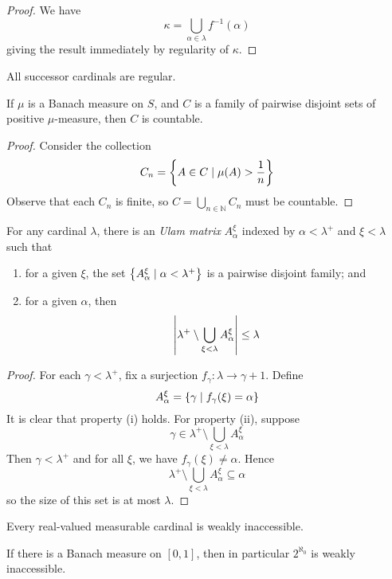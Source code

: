 \begin{proof}
    We have
    \[ \kappa = \bigcup_{\alpha \in \lambda} f^{-1}(\alpha) \]
    giving the result immediately by regularity of \( \kappa \).
\end{proof}
\begin{proposition}
    All successor cardinals are regular.
\end{proposition}
\begin{proposition}
    If \( \mu \) is a Banach measure on \( S \), and \( C \) is a family of pairwise disjoint sets of positive \( \mu \)-measure, then \( C \) is countable.
\end{proposition}
\begin{proof}
    Consider the collection
    \[ C_n = \qty{A \in C \mid \mu(A) > \frac{1}{n}} \]
    Observe that each \( C_n \) is finite, so \( C = \bigcup_{n \in \mathbb N} C_n \) must be countable.
\end{proof}
\begin{lemma}[Ulam]
    For any cardinal \( \lambda \), there is an \emph{Ulam matrix} \( A_\alpha^\xi \) indexed by \( \alpha < \lambda^+ \) and \( \xi < \lambda \) such that
    \begin{enumerate}
        \item for a given \( \xi \), the set \( \qty{A_\alpha^\xi \mid \alpha < \lambda^+} \) is a pairwise disjoint family; and
        \item for a given \( \alpha \), then
        \[ \abs{\lambda^+ \setminus \bigcup_{\xi < \lambda} A_\alpha^\xi} \leq \lambda \]
    \end{enumerate}
\end{lemma}
\begin{proof}
    For each \( \gamma < \lambda^+ \), fix a surjection \( f_\gamma : \lambda \to \gamma + 1 \).
    Define
    \[ A_\alpha^\xi = \qty{\gamma \mid f_\gamma(\xi) = \alpha} \]
    It is clear that property (i) holds.
    For property (ii), suppose
    \[ \gamma \in \lambda^+ \setminus \bigcup_{\xi < \lambda} A_\alpha^\xi \]
    Then \( \gamma < \lambda^+ \) and for all \( \xi \), we have \( f_\gamma(\xi) \neq \alpha \).
    Hence
    \[ \lambda^+ \setminus \bigcup_{\xi < \lambda} A_\alpha^\xi \subseteq \alpha \]
    so the size of this set is at most \( \lambda \).
\end{proof}
\begin{theorem}
    Every real-valued measurable cardinal is weakly inaccessible.
\end{theorem}
\begin{remark}
    If there is a Banach measure on \( [0,1] \), then in particular \( 2^{\aleph_0} \) is weakly inaccessible.
\end{remark}

